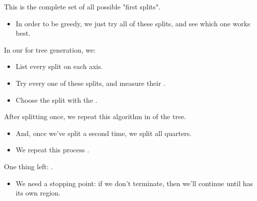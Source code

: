        This is the complete set of all possible "first splits".

        \begin{itemize}
            \item In order to be greedy, we just try all of these splits, and see which one works best.
                \\
        \end{itemize}

        \begin{definition}
            In our  for tree generation, we:

            \begin{itemize}
                \item List every  split on each axis.

                \item Try every one of these splits, and measure their .

                \item Choose the split with the .
            \end{itemize}

            After splitting once, we repeat this algorithm in  of the tree.


            \begin{itemize}
                \item And, once we've split a second time, we split all quarters.

                \item We repeat this process .
            \end{itemize}

        \end{definition}

        One thing left: .

        \begin{itemize}
            \item We need a stopping point: if we don't terminate, then we'll continue until  has its own region.\\
        \end{itemize}
        

